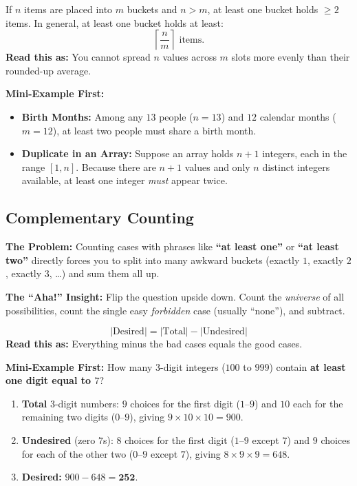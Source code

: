 \documentclass[11pt,a4paper]{article}
\theoremstyle{definition}
\newcommand{\painbeat}{\textbf{\color{accentamber}The Problem:} }
\newcommand{\ahabeat}{\textbf{\color{accentteal}The ``Aha!'' Insight:} }
\newcommand{\examplebeat}{\textbf{\color{primaryblue}Mini-Example First:} }
\begin{document}
\begin{formulabox}
If $n$ items are placed into $m$ buckets and $n > m$, at least one bucket holds $\ge 2$ items. In general, at least one bucket holds at least:
\[
    \left\lceil \frac{n}{m} \right\rceil \text{ items.}
\]
\textbf{Read this as:} You cannot spread $n$ values across $m$ slots more evenly than their rounded-up average.
\end{formulabox}

\examplebeat
\begin{itemize}
    \item \textbf{Birth Months:} Among any $13$ people ($n = 13$) and $12$ calendar months ($m = 12$), at least two people must share a birth month.
    \item \textbf{Duplicate in an Array:} Suppose an array holds $n + 1$ integers, each in the range $[1, n]$. Because there are $n + 1$ values and only $n$ distinct integers available, at least one integer \emph{must} appear twice.
\end{itemize}

\subsection{Complementary Counting}

\painbeat Counting cases with phrases like \textbf{``at least one''} or \textbf{``at least two''} directly forces you to split into many awkward buckets (exactly $1$, exactly $2$, exactly $3$, \dots) and sum them all up.

\ahabeat Flip the question upside down. Count the \emph{universe} of all possibilities, count the single easy \emph{forbidden} case (usually ``none''), and subtract.

\begin{formulabox}
\[
    |\text{Desired}| = |\text{Total}| - |\text{Undesired}|
\]
\textbf{Read this as:} Everything minus the bad cases equals the good cases.
\end{formulabox}

\examplebeat How many $3$-digit integers ($100$ to $999$) contain \textbf{at least one digit equal to $7$}?
\begin{enumerate}
    \item \textbf{Total} $3$-digit numbers: $9$ choices for the first digit ($1$--$9$) and $10$ each for the remaining two digits ($0$--$9$), giving $9 \times 10 \times 10 = 900$.
    \item \textbf{Undesired} (zero $7$s): $8$ choices for the first digit ($1$--$9$ except $7$) and $9$ choices for each of the other two ($0$--$9$ except $7$), giving $8 \times 9 \times 9 = 648$.
    \item \textbf{Desired:} $900 - 648 = \mathbf{252}$.
\end{enumerate}
\end{document}
